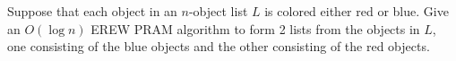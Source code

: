 Suppose that each object in an $n$-object list $L$ is colored either
red or blue. Give an $O(\log  n)$ EREW PRAM algorithm to form 2 lists
from the objects in $L$, one consisting of the blue objects and the
other consisting of the red objects.

